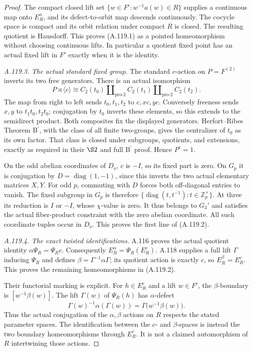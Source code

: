 \begin{proof}
The compact closed lift set
\(\{w\in F':w^{-1}a(w)\in R\}\) supplies a continuous map
onto \(E_R^a\), and its defect-to-orbit map descends continuously.
The cocycle space is compact and its orbit relation under
compact \(R\) is closed. The resulting quotient is Hausdorff.
This proves (A.119.1) as a pointed homeomorphism without
choosing continuous lifts.
In particular a quotient fixed point has an actual fixed
lift in \(F'\) exactly when it is the identity.

\emph{A.119.3. The actual standard fixed group.}
The standard \(c\)-action on \(P=F^{(2)}\) inverts its two
free generators. There is an actual isomorphism
\[
 P\rtimes\langle c\rangle
       \cong C_2(t_0)\amalg_{\mathrm{pro}\text{-}2}
                       C_2(t_1)\amalg_{\mathrm{pro}\text{-}2}C_2(t_2).
 \tag{A.119.5}
\]
The map from right to left sends \(t_0,t_1,t_2\) to \(c,xc,yc\).
Conversely freeness sends \(x,y\) to \(t_1t_0,t_2t_0\);
conjugation by \(t_0\) inverts these elements, so this extends
to the semidirect product. Both composites fix the displayed
generators.
Herfort--Ribes Theorem B\(^{\prime}\), with the class of all
finite two-groups, gives the centralizer of \(t_0\) as its
own factor.\citep{A_HR1985}
That class is closed under subgroups, quotients, and extensions,
exactly as required in their \(\S2\) and full B\(^{\prime}\)
proof. Hence \(P^c=1\).

On the odd abelian coordinates of \(D_o\), \(c\) is \(-I\),
so its fixed part is zero. On \(G_p\) it is conjugation by
\(D=\operatorname{diag}(1,-1)\), since this inverts the two
actual elementary matrices \(X,Y\).
For odd \(p\), commuting with \(D\) forces both off-diagonal
entries to vanish. The fixed subgroup in \(G_p\) is therefore
\(\{\operatorname{diag}(t,t^{-1}):t\in\mathbb Z_p^\times\}\).
At three its reduction is \(I\) or \(-I\), whose \(\chi\)-value
is zero. It thus belongs to \(G_3'\) and satisfies the actual
fiber-product constraint with the zero abelian coordinate.
All such coordinate tuples occur in \(D_o\).
This proves the first line of (A.119.2).

\emph{A.119.4. The exact twisted identifications.}
A.116 proves the actual quotient identity
\(\alpha\Psi_R=\Psi_Rc\). Consequently
\(E_R^\alpha=\Psi_R(E_R^c)\).
A.118 supplies a full lift \(\Gamma\) inducing \(\Psi_R\) and
defines \(\beta=\Gamma^{-1}\alpha\Gamma\); its quotient action
is exactly \(c\), so \(E_R^\beta=E_R^c\).
This proves the remaining homeomorphisms in (A.119.2).

Their functorial marking is explicit. For \(h\in E_R^c\)
and a lift \(w\in F'\), the \(\beta\)-boundary is
\([w^{-1}\beta(w)]\). The lift \(\Gamma(w)\) of \(\Psi_R(h)\)
has \(\alpha\)-defect
\[
       \Gamma(w)^{-1}\alpha(\Gamma(w))
                    =\Gamma\bigl(w^{-1}\beta(w)\bigr).
 \tag{A.119.6}
\]
Thus the actual conjugation of the \(\alpha,\beta\) actions
on \(R\) respects the stated parameter spaces.
The identification between the \(c\)- and \(\beta\)-spaces
is instead the two boundary homeomorphisms through \(E_R^c\).
It is not a claimed automorphism of \(R\) intertwining those
actions.


\end{proof}
